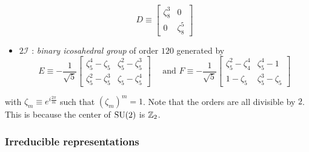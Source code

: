 \begin{itemize}
\begin{equation}
                    D \equiv 
                    \begin{bmatrix}
                        \zeta^3_8 & 0\\
                        0 & \zeta^5_8
                    \end{bmatrix}
                \end{equation}
                \item $2\mathcal{I}$ : \emph{binary icosahedral group} of order $120$ generated by
                \begin{equation}
                    E \equiv -\frac{1}{\sqrt{5}}
                    \begin{bmatrix}
                        \zeta^4_5-\zeta_5 & \zeta^2_5-\zeta^3_5\\
                        \zeta^2_5-\zeta^3_5 & \zeta_5-\zeta^4_5
                    \end{bmatrix}\quad \text{ and }
                    F \equiv -\frac{1}{\sqrt{5}}
                    \begin{bmatrix}
                        \zeta^2_5-\zeta^4_4 & \zeta^4_5-1\\
                        1-\zeta_5 & \zeta^3_5-\zeta_5
                    \end{bmatrix}
                \end{equation}
            \end{itemize}
            with $\zeta_m\equiv e^{i\frac{2\pi}{m}}$ such that $(\zeta_m)^m=1$. Note that the orders are all divisible by $2$. This is because the center of $\text{SU}(2)$ is $\mathbb{Z}_2$.

        \subsubsection{Irreducible representations}\label{sec:irrep}

